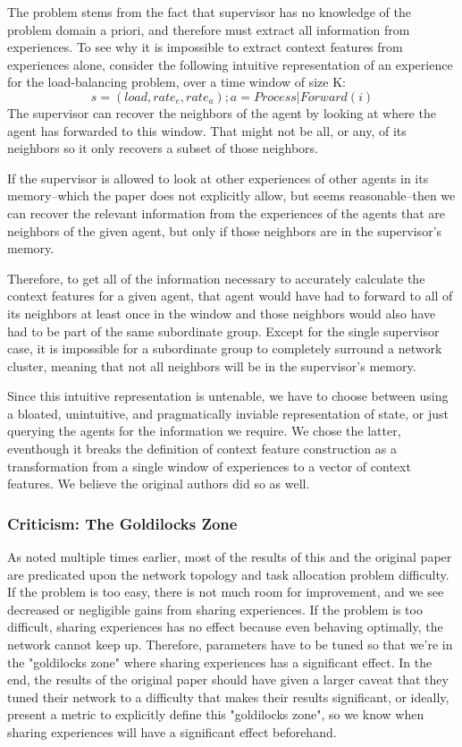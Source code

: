 \documentclass[letterpaper]{article}
\begin{document}
The problem stems from the fact that supervisor has no knowledge of the problem domain a priori, and therefore must extract all information from experiences. To see why it is impossible to extract context features from experiences alone, consider the following intuitive representation of an experience for the load-balancing problem, over a time window of size K:
$$ s = (load, rate_e, rate_a); a = Process | Forward(i) $$
The supervisor can recover the neighbors of the agent by looking at where the agent has forwarded to this window.  That might not be all, or any, of its neighbors so it only recovers a subset of those neighbors.

If the supervisor is allowed to look at other experiences of other agents in its memory--which the paper does not explicitly allow, but seems reasonable--then we can recover the relevant information from the experiences of the agents that are neighbors of the given agent, but only if those neighbors are in the supervisor’s memory.

Therefore, to get all of the information necessary to accurately calculate the context features for a given agent, that agent would have had to forward to all of its neighbors at least once in the window and those neighbors would also have had to be part of the same subordinate group.  Except for the single supervisor case, it is impossible for a subordinate group to completely surround a network cluster, meaning that not all neighbors will be in the supervisor's memory.

Since this intuitive representation is untenable, we have to choose between using a bloated, unintuitive, and pragmatically inviable representation of state, or just querying the agents for the information we require.  We chose the latter, eventhough it breaks the definition of context feature construction as a transformation from a single window of experiences to a vector of context features.  We believe the original authors did so as well.

\subsubsection{Criticism: The Goldilocks Zone}
As noted multiple times earlier, most of the results of this and the original paper are predicated upon the network topology and task allocation problem difficulty.  If the problem is too easy, there is not much room for improvement, and we see decreased or negligible gains from sharing experiences.  If the problem is too difficult, sharing experiences has no effect because even behaving optimally, the network cannot keep up.  Therefore, parameters have to be tuned so that we're in the "goldilocks zone" where sharing experiences has a significant effect.  In the end, the results of the original paper should have given a larger caveat that they tuned their network to a difficulty that makes their results significant, or ideally, present a metric to explicitly define this "goldilocks zone", so we know when sharing experiences will have a significant effect beforehand.
\end{document}
